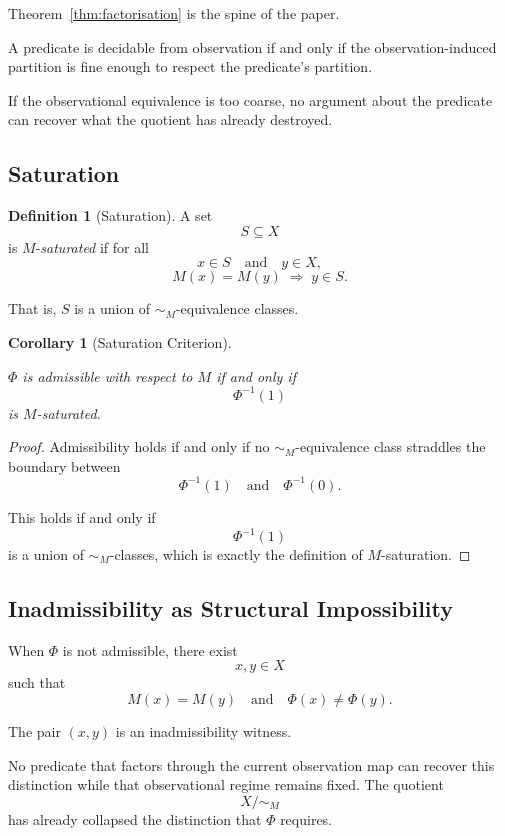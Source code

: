 \documentclass[12pt]{article}
\theoremstyle{plain}
\newtheorem{corollary}[theorem]{Corollary}
\theoremstyle{definition}
\newtheorem{definition}[theorem]{Definition}
\theoremstyle{remark}
\begin{document}
Theorem~\ref{thm:factorisation} is the spine of the paper.

A predicate is decidable from observation if and only if the
observation-induced partition is fine enough to respect the
predicate's partition.

If the observational equivalence is too coarse, no argument about the
predicate can recover what the quotient has already destroyed.

\subsection{Saturation}

\begin{definition}[Saturation]

A set
\[
S \subseteq X
\]
is $M$-\emph{saturated} if for all
\[
x \in S
\quad\text{and}\quad
y \in X,
\]
\[
M(x) = M(y)
\;\Rightarrow\;
y \in S.
\]

That is, $S$ is a union of $\sim_M$-equivalence classes.
\end{definition}

\begin{corollary}[Saturation Criterion]
\label{cor:saturation}

$\Phi$ is admissible with respect to $M$ if and only if
\[
\Phi^{-1}(1)
\]
is $M$-saturated.
\end{corollary}

\begin{proof}

Admissibility holds if and only if no $\sim_M$-equivalence class
straddles the boundary between
\[
\Phi^{-1}(1)
\quad\text{and}\quad
\Phi^{-1}(0).
\]

This holds if and only if
\[
\Phi^{-1}(1)
\]
is a union of $\sim_M$-classes, which is exactly the definition of
$M$-saturation.
\end{proof}

\subsection{Inadmissibility as Structural Impossibility}

When $\Phi$ is not admissible, there exist
\[
x, y \in X
\]
such that
\[
M(x) = M(y)
\quad\text{and}\quad
\Phi(x) \neq \Phi(y).
\]

The pair $(x,y)$ is an inadmissibility witness.

No predicate that factors through the current observation map can
recover this distinction while that observational regime remains fixed.
The quotient
\[
X/{\sim_M}
\]
has already collapsed the distinction that $\Phi$ requires.
\end{document}

